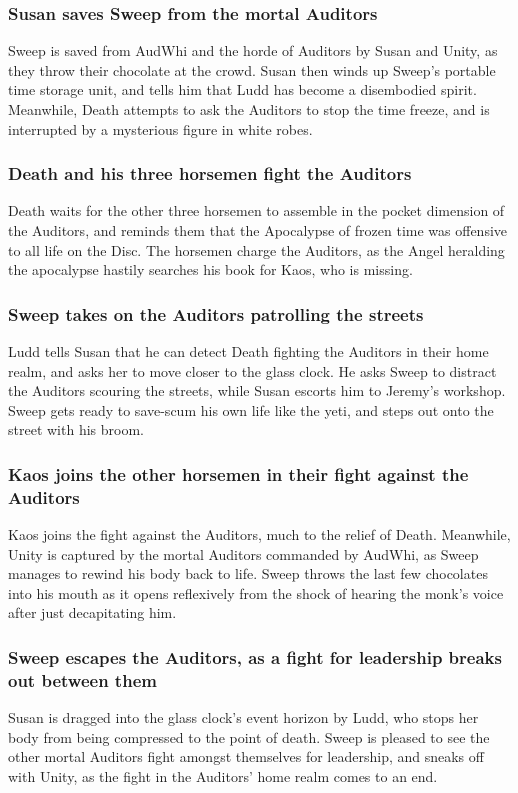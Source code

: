 \subsubsection{\Gls{Susan} saves \Gls{Sweep} from the mortal Auditors}
\Gls{Sweep} is saved from \Gls{AudWhi} and the horde of Auditors by \Gls{Susan} and \Gls{Unity},
as they throw their chocolate at the crowd. \Gls{Susan} then winds up \Gls{Sweep}'s portable time
storage unit, and tells him that \Gls{Ludd} has become a disembodied spirit. Meanwhile, \Gls{Death}
attempts to ask the Auditors to stop the time freeze, and is interrupted by a mysterious figure in
white robes.

\subsubsection{\Gls{Death} and his three horsemen fight the Auditors}
\Gls{Death} waits for the other three horsemen to assemble in the pocket dimension of the Auditors,
and reminds them that the Apocalypse of frozen time was offensive to all life on the Disc. The
horsemen charge the Auditors, as the Angel heralding the apocalypse hastily searches his book for
\Gls{Kaos}, who is missing.

\subsubsection{\Gls{Sweep} takes on the Auditors patrolling the streets}
\Gls{Ludd} tells \Gls{Susan} that he can detect \Gls{Death} fighting the Auditors in their home
realm, and asks her to move closer to the glass clock. He asks \Gls{Sweep} to distract the Auditors
scouring the streets, while \Gls{Susan} escorts him to \Gls{Jeremy}'s workshop. \Gls{Sweep} gets
ready to save-scum his own life like the yeti, and steps out onto the street with his broom.

\subsubsection{\Gls{Kaos} joins the other horsemen in their fight against the Auditors}
\Gls{Kaos} joins the fight against the Auditors, much to the relief of \Gls{Death}. Meanwhile,
\Gls{Unity} is captured by the mortal Auditors commanded by \Gls{AudWhi}, as \Gls{Sweep} manages to
rewind his body back to life. \Gls{Sweep} throws the last few chocolates into his mouth as it opens
reflexively from the shock of hearing the monk's voice after just decapitating him.

\subsubsection{\Gls{Sweep} escapes the Auditors, as a fight for leadership breaks out between them}
\Gls{Susan} is dragged into the glass clock's event horizon by \Gls{Ludd}, who stops her body from
being compressed to the point of death. \Gls{Sweep} is pleased to see the other mortal Auditors
fight amongst themselves for leadership, and sneaks off with \Gls{Unity}, as the fight in the
Auditors' home realm comes to an end.

